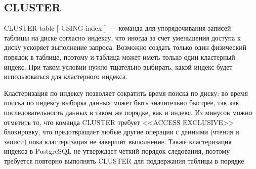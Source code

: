 \subsection{CLUSTER}
CLUSTER table [ USING index ]~--- команда для упорядочивания записей таблицы на диске согласно индексу, что иногда за счет уменьшения доступа к диску ускоряет выполнение запроса. Возможно создать только один физический порядок в таблице, поэтому и таблица может иметь только один кластерный индекс. При таком условии нужно тщательно выбирать, какой индекс будет использоваться для кластерного индекса. 

Кластеризация по индексу позволяет сократить время поиска по диску: во время поиска по индексу выборка данных может быть значительно быстрее, так как последовательность данных в таком же порядке, как и индекс. Из минусов можно отметить то, что команда CLUSTER требует <<ACCESS EXCLUSIVE>> блокировку, что предотвращает любые другие операции с данными (чтения и записи) пока кластеризация не завершит выполнение. Также кластеризация индекса в PostgreSQL не утверждает четкий порядок следования, поэтому требуется повторно выполнять CLUSTER для поддержания таблицы в порядке.